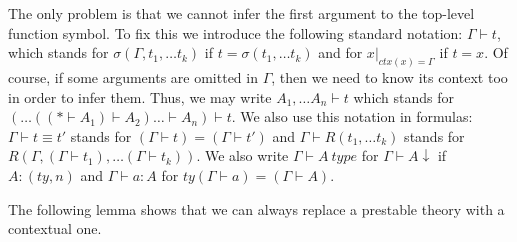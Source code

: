 \documentclass[reqno]{amsart}
\theoremstyle{definition}
\theoremstyle{remark}
\numberwithin{figure}{section}
\begin{document}
The only problem is that we cannot infer the first argument to the top-level function symbol.
To fix this we introduce the following standard notation: $\Gamma \vdash t$, which stands for $\sigma(\Gamma, t_1, \ldots t_k)$ if $t = \sigma(t_1, \ldots t_k)$
and for $x|_{ctx(x) = \Gamma}$ if $t = x$.
Of course, if some arguments are omitted in $\Gamma$, then we need to know its context too in order to infer them.
Thus, we may write $A_1, \ldots A_n \vdash t$ which stands for $(\ldots ((* \vdash A_1) \vdash A_2) \ldots \vdash A_n) \vdash t$.
We also use this notation in formulas: $\Gamma \vdash t \equiv t'$ stands for $(\Gamma \vdash t) = (\Gamma \vdash t')$
and $\Gamma \vdash R(t_1, \ldots t_k)$ stands for $R(\Gamma, (\Gamma \vdash t_1), \ldots (\Gamma \vdash t_k))$.
We also write $\Gamma \vdash A\ type$ for $\Gamma \vdash A\!\downarrow$ if $A : (ty,n)$ and $\Gamma \vdash a : A$ for $ty(\Gamma \vdash a) = (\Gamma \vdash A)$.

The following lemma shows that we can always replace a prestable theory with a contextual one.
\end{document}
